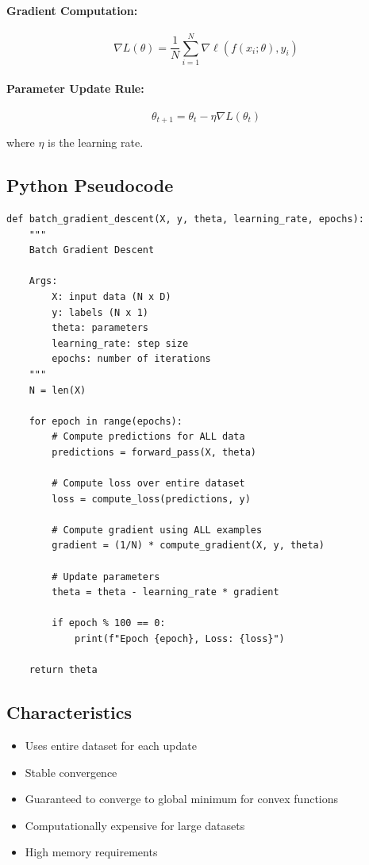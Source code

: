 \documentclass{tufte-handout}
\begin{document}
\paragraph{Gradient Computation:}
\begin{equation}
\nabla L(\theta) = \frac{1}{N} \sum_{i=1}^{N} \nabla \ell(f(x_i; \theta), y_i)
\end{equation}

\paragraph{Parameter Update Rule:}
\begin{equation}
\theta_{t+1} = \theta_t - \eta \nabla L(\theta_t)
\end{equation}

where $\eta$ is the learning rate.

\subsection{Python Pseudocode}

\begin{lstlisting}
def batch_gradient_descent(X, y, theta, learning_rate, epochs):
    """
    Batch Gradient Descent
    
    Args:
        X: input data (N x D)
        y: labels (N x 1)
        theta: parameters
        learning_rate: step size
        epochs: number of iterations
    """
    N = len(X)
    
    for epoch in range(epochs):
        # Compute predictions for ALL data
        predictions = forward_pass(X, theta)
        
        # Compute loss over entire dataset
        loss = compute_loss(predictions, y)
        
        # Compute gradient using ALL examples
        gradient = (1/N) * compute_gradient(X, y, theta)
        
        # Update parameters
        theta = theta - learning_rate * gradient
        
        if epoch % 100 == 0:
            print(f"Epoch {epoch}, Loss: {loss}")
    
    return theta
\end{lstlisting}

\subsection{Characteristics}
\begin{itemize}
    \item Uses entire dataset for each update
    \item Stable convergence
    \item Guaranteed to converge to global minimum for convex functions
    \item Computationally expensive for large datasets
    \item High memory requirements
\end{itemize}
\end{document}
